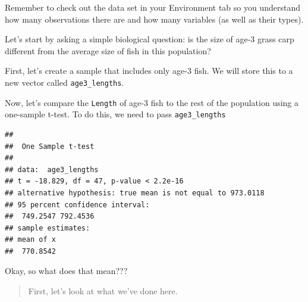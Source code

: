 \documentclass[
]{book}
\newenvironment{Shaded}{\begin{snugshade}}{\end{snugshade}}
\newcommand{\CommentTok}[1]{\textcolor[rgb]{0.56,0.35,0.01}{\textit{#1}}}
\newcommand{\DataTypeTok}[1]{\textcolor[rgb]{0.13,0.29,0.53}{#1}}
\newcommand{\DecValTok}[1]{\textcolor[rgb]{0.00,0.00,0.81}{#1}}
\newcommand{\FloatTok}[1]{\textcolor[rgb]{0.00,0.00,0.81}{#1}}
\newcommand{\KeywordTok}[1]{\textcolor[rgb]{0.13,0.29,0.53}{\textbf{#1}}}
\newcommand{\NormalTok}[1]{#1}
\newcommand{\OperatorTok}[1]{\textcolor[rgb]{0.81,0.36,0.00}{\textbf{#1}}}
\newcommand{\StringTok}[1]{\textcolor[rgb]{0.31,0.60,0.02}{#1}}
\begin{document}
Remember to check out the data set in your Environment tab so you understand how many observations there are and how many variables (as well as their types).

Let's start by asking a simple biological question: is the size of age-3 grass carp different from the average size of fish in this population?

First, let's create a sample that includes only age-3 fish. We will store this to a new vector called \texttt{age3\_lengths}.

\begin{Shaded}
\end{Shaded}

Now, let's compare the \texttt{Length} of age-3 fish to the rest of the population using a one-sample t-test. To do this, we need to pass \texttt{age3\_lengths}

\begin{Shaded}
\end{Shaded}

\begin{verbatim}
## 
## 	One Sample t-test
## 
## data:  age3_lengths
## t = -18.829, df = 47, p-value < 2.2e-16
## alternative hypothesis: true mean is not equal to 973.0118
## 95 percent confidence interval:
##  749.2547 792.4536
## sample estimates:
## mean of x 
##  770.8542
\end{verbatim}

Okay, so what does that mean???

\begin{quote}
First, let's look at what we've done here.
\end{quote}
\end{document}
